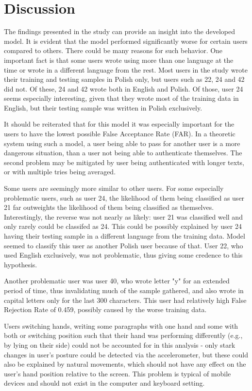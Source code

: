 \section{Discussion}
The findings presented in the study can provide an insight into the developed model. It is evident that the model performed significantly worse for certain users compared to others. There could be many reasons for such behavior. One important fact is that some users wrote using more than one language at the time or wrote in a different language from the rest. Most users in the study wrote their training and testing samples in Polish only, but users such as 22, 24 and 42 did not. Of these, 24 and 42 wrote both in English and Polish. Of those, user 24 seems especially interesting, given that they wrote most of the training data in English, but their testing sample was written in Polish exclusively.

It should be reiterated that for this model it was especially important for the users to have the lowest possible False Acceptance Rate (FAR). In a theoretic system using such a model, a user being able to pass for another user is a more dangerous situation, than a user not being able to authenticate themselves. The second problem may be mitigated by user being authenticated with longer texts, or with multiple tries being averaged.

Some users are seemingly more similar to other users. For some especially problematic users, such as user 24, the likelihood of them being classified as user 21 far outweights the likelihood of them being classified as themselves. Interestingly, the reverse was not nearly as likely: user 21 was classified well and only rarely could be classifed as 24. This could be possibly explained by user 24 having their testing sample in a different language from the training data. Model seemed to classify this user as another Polish user because of that. User 22, who used English exclusively, was not problematic, thus giving some credence to this hypothesis.

Another problematic user was user 40, who wrote letter "y" for an extended period of time, thus invalidating much of the sample gathered, and also wrote in capital letters only for the last 300 characters. This user had relatively high False Rejection Rate of 0.459, possibly caused by the worse training data.

Users switching hands, writing some paragraphs with one hand and some with both or switching position such that their hand was performing differently (e.g., by lying on their side) could not be accounted for in this analysis - only stark changes in user's posture could be detected via the accelerometer, but these could also be explained by natural movements, which should not have any effect on the user's hand position relative to the screen. This problem is typical of mobile devices and should not exist in the computer and keyboard setting.

